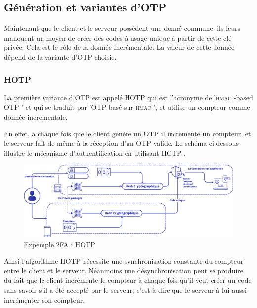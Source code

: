 \documentclass[a4paper, 10pt]{article}
\newcommand{\otp}{\textsc{OTP} }
\newcommand{\hotp}{\textsc{HOTP} }
\newcommand{\hmac}{\textsc{hmac} }
\begin{document}
        \subsection{Génération et variantes d'\otp}

    Maintenant que le client et le serveur possèdent une \textcolor{mygreen}{donné commune}, ils leurs manquent un \textcolor{myblue}{moyen de créer des codes à usage unique} à partir de cette clé privée. Cela est le rôle de la \textcolor{mygreen}{donnée incrémentale}. La valeur de cette donnée dépend de la variante d'\otp choisie.

            \subsubsection{\hotp}
            
    La première variante d'\otp est appelé \hotp 
qui est l'acronyme de \textcolor{myblue}{'\hmac-based \otp'} et qui se traduit par '\otp basé sur \hmac', 
et utilise un \textcolor{mygreen}{compteur} comme donnée incrémentale.

    En effet, à chaque fois que le client génère un \otp il incrémente un compteur, et le serveur fait de même à la réception d'un \otp valide. Le schéma ci-dessous illustre le mécanisme d'authentification en utilisant \hotp.


\begin{figure}[H]
        \centering
        \includegraphics[scale=0.30]{img/1/2/2FA-hotp.png}
        \caption{Expemple 2FA : \hotp\\}
        \label{fig:2fa-hotp}
\end{figure}


Ainsi l'algorithme \hotp nécessite une \textcolor{myblue}{synchronisation constante du compteur} entre le client et le serveur. 
Néanmoins une \textcolor{myblue}{désynchronisation} peut se produire du fait que le client incrémente le compteur à chaque fois qu’il veut créer un code sans savoir s’il a été accepté par le serveur, c’est-à-dire que le serveur à lui aussi incrémenter son compteur.\\
\end{document}

